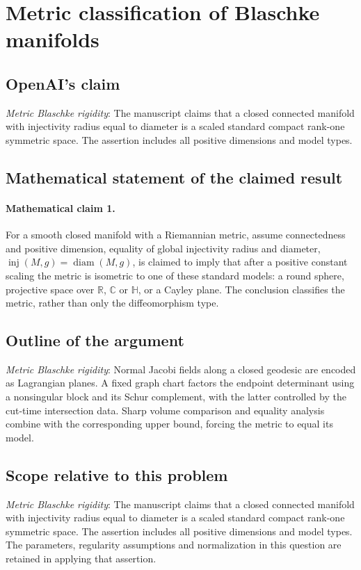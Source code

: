 \documentclass[11pt]{article}
\begin{document}
\section*{Metric classification of Blaschke manifolds}

\subsection{OpenAI's claim}
\textit{Metric Blaschke rigidity}: The manuscript claims that a closed connected manifold with injectivity radius equal to diameter is a scaled standard compact rank-one symmetric space. The assertion includes all positive dimensions and model types.

\subsection{Mathematical statement of the claimed result}
\paragraph{Mathematical claim 1.} For a smooth closed manifold with a Riemannian metric, assume connectedness and positive dimension, equality of global injectivity radius and diameter, $\operatorname{inj}(M,g)=\operatorname{diam}(M,g)$, is claimed to imply that after a positive constant scaling the metric is isometric to one of these standard models: a round sphere, projective space over $\mathbb R$, $\mathbb C$ or $\mathbb H$, or a Cayley plane. The conclusion classifies the metric, rather than only the diffeomorphism type.

\subsection{Outline of the argument}
\textit{Metric Blaschke rigidity}: Normal Jacobi fields along a closed geodesic are encoded as Lagrangian planes. A fixed graph chart factors the endpoint determinant using a nonsingular block and its Schur complement, with the latter controlled by the cut-time intersection data. Sharp volume comparison and equality analysis combine with the corresponding upper bound, forcing the metric to equal its model.

\subsection{Scope relative to this problem}
\textit{Metric Blaschke rigidity}: The manuscript claims that a closed connected manifold with injectivity radius equal to diameter is a scaled standard compact rank-one symmetric space. The assertion includes all positive dimensions and model types. The parameters, regularity assumptions and normalization in this question are retained in applying that assertion.
\end{document}
